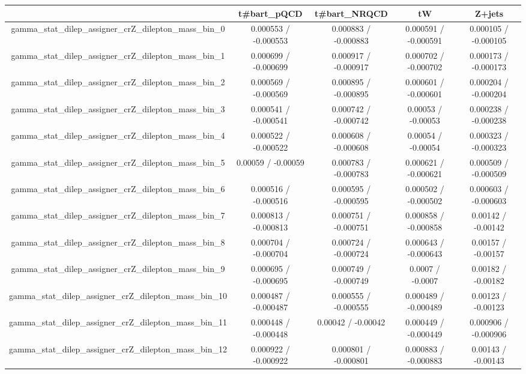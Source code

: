 \documentclass[10pt]{article}
\begin{document}
\begin{table}[htbp]
\begin{center}
\begin{tabular}{|c|c|c|c|c|}
\hline 
      & t#bar{t}_{pQCD}      & t#bar{t}_{NRQCD}      & tW      & Z+jets \\ 
\hline 
  gamma_stat_dilep_assigner_crZ_dilepton_mass_bin_0 & 0.000553 / -0.000553 & 0.000883 / -0.000883 & 0.000591 / -0.000591 & 0.000105 / -0.000105 \\ 
  gamma_stat_dilep_assigner_crZ_dilepton_mass_bin_1 & 0.000699 / -0.000699 & 0.000917 / -0.000917 & 0.000702 / -0.000702 & 0.000173 / -0.000173 \\ 
  gamma_stat_dilep_assigner_crZ_dilepton_mass_bin_2 & 0.000569 / -0.000569 & 0.000895 / -0.000895 & 0.000601 / -0.000601 & 0.000204 / -0.000204 \\ 
  gamma_stat_dilep_assigner_crZ_dilepton_mass_bin_3 & 0.000541 / -0.000541 & 0.000742 / -0.000742 & 0.00053 / -0.00053 & 0.000238 / -0.000238 \\ 
  gamma_stat_dilep_assigner_crZ_dilepton_mass_bin_4 & 0.000522 / -0.000522 & 0.000608 / -0.000608 & 0.00054 / -0.00054 & 0.000323 / -0.000323 \\ 
  gamma_stat_dilep_assigner_crZ_dilepton_mass_bin_5 & 0.00059 / -0.00059 & 0.000783 / -0.000783 & 0.000621 / -0.000621 & 0.000509 / -0.000509 \\ 
  gamma_stat_dilep_assigner_crZ_dilepton_mass_bin_6 & 0.000516 / -0.000516 & 0.000595 / -0.000595 & 0.000502 / -0.000502 & 0.000603 / -0.000603 \\ 
  gamma_stat_dilep_assigner_crZ_dilepton_mass_bin_7 & 0.000813 / -0.000813 & 0.000751 / -0.000751 & 0.000858 / -0.000858 & 0.00142 / -0.00142 \\ 
  gamma_stat_dilep_assigner_crZ_dilepton_mass_bin_8 & 0.000704 / -0.000704 & 0.000724 / -0.000724 & 0.000643 / -0.000643 & 0.00157 / -0.00157 \\ 
  gamma_stat_dilep_assigner_crZ_dilepton_mass_bin_9 & 0.000695 / -0.000695 & 0.000749 / -0.000749 & 0.0007 / -0.0007 & 0.00182 / -0.00182 \\ 
  gamma_stat_dilep_assigner_crZ_dilepton_mass_bin_10 & 0.000487 / -0.000487 & 0.000555 / -0.000555 & 0.000489 / -0.000489 & 0.00123 / -0.00123 \\ 
  gamma_stat_dilep_assigner_crZ_dilepton_mass_bin_11 & 0.000448 / -0.000448 & 0.00042 / -0.00042 & 0.000449 / -0.000449 & 0.000906 / -0.000906 \\ 
  gamma_stat_dilep_assigner_crZ_dilepton_mass_bin_12 & 0.000922 / -0.000922 & 0.000801 / -0.000801 & 0.000883 / -0.000883 & 0.00143 / -0.00143 \\ 

\end{tabular}
\end{center}
\end{table}
\end{document}
